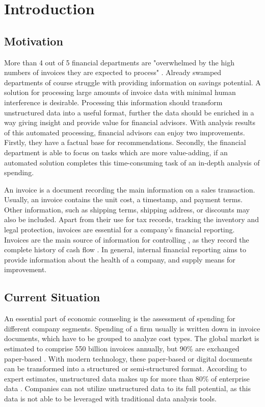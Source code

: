 \chapter{Introduction}
\section{Motivation}

More than 4 out of 5 financial departments are "overwhelmed by the high numbers of invoices they are expected to process"  \cite{manualInvoiceProcessing}. Already swamped departments of course struggle with providing information on savings potential. A solution for processing large amounts of invoice data with minimal human interference is desirable. Processing this information should transform unstructured data into a useful format, further the data should be enriched in a way giving insight and provide value for financial advisors. With analysis results of this automated processing, financial advisors can enjoy two improvements. Firstly, they have a factual base for recommendations. Secondly, the financial department is able to focus on tasks which are more value-adding, if an automated solution completes this time-consuming task of an in-depth analysis of spending.

An invoice is a document recording the main information on a sales transaction. Usually, an invoice contains the unit cost, a timestamp, and payment terms. Other information, such as shipping terms, shipping address, or discounts may also be included. Apart from their use for tax records, tracking the inventory and legal protection, invoices are essential for a company's financial reporting. Invoices are the main source of information for controlling \cite{investopediaInvoices}, as they record the complete history of cash flow \cite{invoicesPurpose}. In general, internal financial reporting aims to provide information about the health of a company, and supply means for improvement. 

\section{Current Situation}
An essential part of economic counseling is the assessment of spending for different company segments. Spending of a firm usually is written down in invoice documents, which have to be grouped  to analyze cost types.
The global market is estimated to comprise 550 billion invoices annually, but 90\% are exchanged paper-based \cite{kochEInvoicingJourney}. With modern technology, these paper-based or digital documents can be transformed into a structured or semi-structured format. According to expert estimates, unstructured data makes up for more than 80\% of enterprise data \cite{structuredAndUnstructuredData}. Companies can not utilize unstructured data to its full potential, as this data is not able to be leveraged with traditional data analysis tools.

